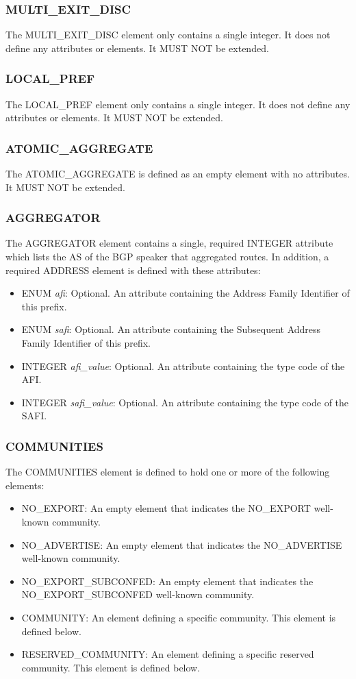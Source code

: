 \documentclass{article}
\begin{document}
\subsubsection{MULTI_EXIT_DISC}
The MULTI_EXIT_DISC element only contains a single integer.  It does not define any attributes or elements. It MUST NOT be extended.

\subsubsection{LOCAL_PREF}
The LOCAL_PREF element only contains a single integer.  It does not define any attributes or elements.  It MUST NOT be extended.

\subsubsection{ATOMIC_AGGREGATE}
The ATOMIC_AGGREGATE is defined as an empty element with no attributes.  It MUST NOT be extended.

\subsubsection{AGGREGATOR}
The AGGREGATOR element contains a single, required INTEGER attribute which lists the AS of the BGP speaker that aggregated routes.  In addition, a required ADDRESS element is defined with these attributes:

\begin{itemize}
\item{ENUM \emph{afi}: Optional. An attribute containing the Address Family Identifier of this prefix.}
\item{ENUM \emph{safi}: Optional. An attribute containing the Subsequent Address Family Identifier of this prefix.}
\item{INTEGER \emph{afi_value}: Optional. An attribute containing the type code of the AFI.}
\item{INTEGER \emph{safi_value}: Optional. An attribute containing the type code of the SAFI.}
\end{itemize}

\subsubsection{COMMUNITIES}
The COMMUNITIES element is defined to hold one or more of the following elements:

\begin{itemize}
\item{NO_EXPORT: An empty element that indicates the NO_EXPORT well-known community.}
\item{NO_ADVERTISE: An empty element that indicates the NO_ADVERTISE well-known community.}
\item{NO_EXPORT_SUBCONFED: An empty element that indicates the NO_EXPORT_SUBCONFED well-known community.}
\item{COMMUNITY: An element defining a specific community.  This element is defined below.}
\item{RESERVED_COMMUNITY: An element defining a specific reserved community.  This element is defined below.}
\end{itemize}
\end{document}
